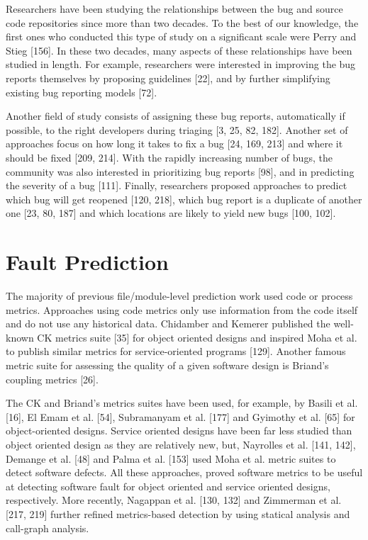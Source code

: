 \documentclass[12pt]{report}
\begin{document}
Researchers have been studying the relationships between the bug and
source code repositories since more than two decades. To the best of our
knowledge, the first ones who conducted this type of study on a
significant scale were Perry and Stieg {[}156{]}. In these two decades,
many aspects of these relationships have been studied in length. For
example, researchers were interested in improving the bug reports
themselves by proposing guidelines {[}22{]}, and by further simplifying
existing bug reporting models {[}72{]}.

Another field of study consists of assigning these bug reports,
automatically if possible, to the right developers during triaging {[}3,
25, 82, 182{]}. Another set of approaches focus on how long it takes to
fix a bug {[}24, 169, 213{]} and where it should be fixed {[}209,
214{]}. With the rapidly increasing number of bugs, the community was
also interested in prioritizing bug reports {[}98{]}, and in predicting
the severity of a bug {[}111{]}. Finally, researchers proposed
approaches to predict which bug will get reopened {[}120, 218{]}, which
bug report is a duplicate of another one {[}23, 80, 187{]} and which
locations are likely to yield new bugs {[}100, 102{]}.

\section{Fault Prediction}\label{fault-prediction}

The majority of previous file/module-level prediction work used code or
process metrics. Approaches using code metrics only use information from
the code itself and do not use any historical data. Chidamber and
Kemerer published the well-known CK metrics suite {[}35{]} for object
oriented designs and inspired Moha et al. to publish similar metrics for
service-oriented programs {[}129{]}. Another famous metric suite for
assessing the quality of a given software design is Briand's coupling
metrics {[}26{]}.

The CK and Briand's metrics suites have been used, for example, by
Basili et al. {[}16{]}, El Emam et al. {[}54{]}, Subramanyam et al.
{[}177{]} and Gyimothy et al. {[}65{]} for object-oriented designs.
Service oriented designs have been far less studied than object oriented
design as they are relatively new, but, Nayrolles et al. {[}141, 142{]},
Demange et al. {[}48{]} and Palma et al. {[}153{]} used Moha et al.
metric suites to detect software defects. All these approaches, proved
software metrics to be useful at detecting software fault for object
oriented and service oriented designs, respectively. More recently,
Nagappan et al. {[}130, 132{]} and Zimmerman et al. {[}217, 219{]}
further refined metrics-based detection by using statical analysis and
call-graph analysis.
\end{document}

